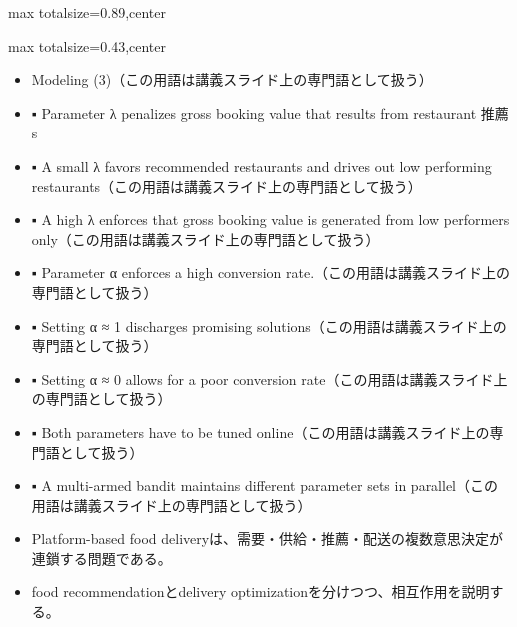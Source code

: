\begin{minipage}[t]{0.58\textwidth}
\begin{adjustbox}{max totalsize={\textwidth}{0.89\textheight},center}
\begin{minipage}{\textwidth}
\end{minipage}
\end{adjustbox}
\end{minipage}


\clearpage
{}
\begin{minipage}[t]{0.405\textwidth}
\begin{adjustbox}{max totalsize={\textwidth}{0.43\textheight},center}
\begin{minipage}{\textwidth}\scriptsize
{}\begin{itemize}
\item Modeling (3)（この用語は講義スライド上の専門語として扱う）
\item ▪ Parameter λ penalizes gross booking value that results from restaurant 推薦s
\item ▪ A small λ favors recommended restaurants and drives out low performing restaurants（この用語は講義スライド上の専門語として扱う）
\item ▪ A high λ enforces that gross booking value is generated from low performers only（この用語は講義スライド上の専門語として扱う）
\item ▪ Parameter α enforces a high conversion rate.（この用語は講義スライド上の専門語として扱う）
\item ▪ Setting α ≈ 1 discharges promising solutions（この用語は講義スライド上の専門語として扱う）
\item ▪ Setting α ≈ 0 allows for a poor conversion rate（この用語は講義スライド上の専門語として扱う）
\item ▪ Both parameters have to be tuned online（この用語は講義スライド上の専門語として扱う）
\item ▪ A multi-armed bandit maintains different parameter sets in parallel（この用語は講義スライド上の専門語として扱う）
\end{itemize}\begin{itemize}
\item Platform-based food deliveryは、需要・供給・推薦・配送の複数意思決定が連鎖する問題である。
\item food recommendationとdelivery optimizationを分けつつ、相互作用を説明する。
\end{itemize}
\end{minipage}
\end{adjustbox}
\end{minipage}\hfill
